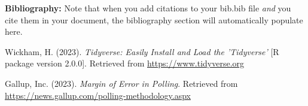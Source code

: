 \documentclass{article}\usepackage[]{graphicx}\usepackage[]{xcolor}
\begin{document}
\begin{multicols}{2}
\vspace{2em}

\noindent\textbf{Bibliography:} Note that when you add citations to your bib.bib file \emph{and}
you cite them in your document, the bibliography section will automatically populate here.

\begin{tiny}
\noindent Wickham, H. (2023). \textit{Tidyverse: Easily Install and Load the 'Tidyverse'} [R package version 2.0.0]. Retrieved from \url{https://www.tidyverse.org}

\noindent Gallup, Inc. (2023). \textit{Margin of Error in Polling}. Retrieved from \url{https://news.gallup.com/polling-methodology.aspx}


\end{tiny}
\end{multicols}
\end{document}
